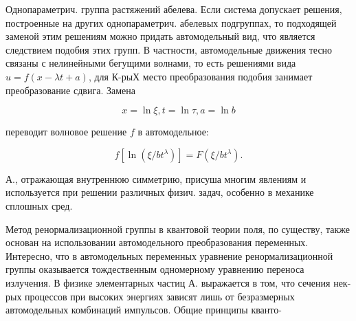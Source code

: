 \documentclass[10pt]{article}
\begin{document}
Однопараметрич. группа растяжений абелева. Если система допускает решения, построенные на других однопараметрич. абелевых подгруппах, то подходящей заменой этим решениям можно придать автомодельный вид, что является следствием подобия этих групп. В частности, автомодельные движения тесно связаны с нелинейными бегущими волнами, то есть решениями вида $u=f(x-\lambda t+a)$, для К-рыХ место преобразования подобия занимает преобразование сдвига. Замена



\[

x=\ln \xi, t=\ln \tau, a=\ln b

\]



переводит волновое решение $f$ в автомодельное:



\[

f\left[\ln \left(\xi / b t^{\lambda}\right)\right]=F\left(\xi / b t^{\lambda}\right) .

\]



А., отражающая внутреннюю симметрию, присуша многим явлениям и используется при решении различных физич. задач, особенно в механике сплошных сред.



Метод ренормализационной группы в квантовой теории поля, по существу, также основан на использовании автомодельного преобразования переменных. Интересно, что в автомодельных переменных уравнение ренормализационной группы оказывается тождественным одномерному уравнению переноса излучения. В физике элементарных частиц А. выражается в том, что сечения нек-рых процессов при высоких энергиях зависят лишь от безразмерных автомодельных комбинаций импульсов. Общие принципы кванто-
\end{document}
